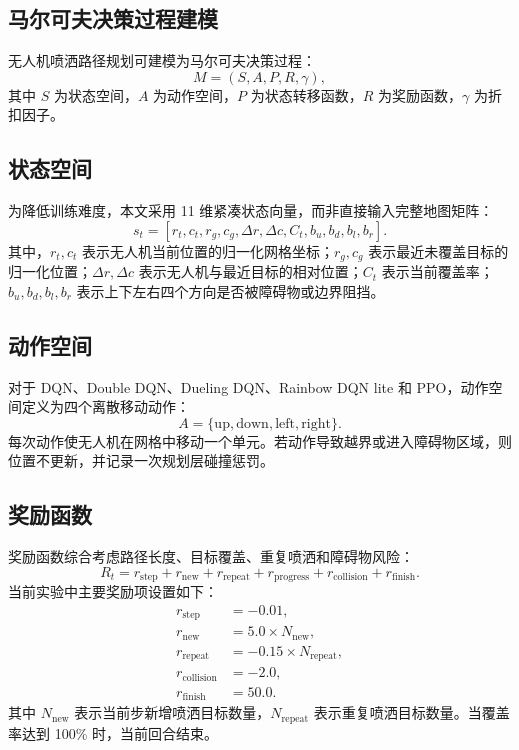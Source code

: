 \documentclass[UTF8]{ctexart}
\begin{document}
\subsection{马尔可夫决策过程建模}

无人机喷洒路径规划可建模为马尔可夫决策过程：
\begin{equation}
M = (S, A, P, R, \gamma),
\end{equation}
其中 $S$ 为状态空间，$A$ 为动作空间，$P$ 为状态转移函数，$R$ 为奖励函数，$\gamma$ 为折扣因子。

\subsection{状态空间}

为降低训练难度，本文采用 11 维紧凑状态向量，而非直接输入完整地图矩阵：
\begin{equation}
s_t = [r_t, c_t, r_g, c_g, \Delta r, \Delta c, C_t, b_u, b_d, b_l, b_r].
\end{equation}
其中，$r_t,c_t$ 表示无人机当前位置的归一化网格坐标；$r_g,c_g$ 表示最近未覆盖目标的归一化位置；$\Delta r,\Delta c$ 表示无人机与最近目标的相对位置；$C_t$ 表示当前覆盖率；$b_u,b_d,b_l,b_r$ 表示上下左右四个方向是否被障碍物或边界阻挡。

\subsection{动作空间}

对于 DQN、Double DQN、Dueling DQN、Rainbow DQN lite 和 PPO，动作空间定义为四个离散移动动作：
\begin{equation}
A = \{\mathrm{up}, \mathrm{down}, \mathrm{left}, \mathrm{right}\}.
\end{equation}
每次动作使无人机在网格中移动一个单元。若动作导致越界或进入障碍物区域，则位置不更新，并记录一次规划层碰撞惩罚。

\subsection{奖励函数}

奖励函数综合考虑路径长度、目标覆盖、重复喷洒和障碍物风险：
\begin{equation}
R_t = r_{\mathrm{step}} + r_{\mathrm{new}} + r_{\mathrm{repeat}} + r_{\mathrm{progress}} + r_{\mathrm{collision}} + r_{\mathrm{finish}}.
\end{equation}
当前实验中主要奖励项设置如下：
\begin{align}
r_{\mathrm{step}} &= -0.01, \\
r_{\mathrm{new}} &= 5.0 \times N_{\mathrm{new}}, \\
r_{\mathrm{repeat}} &= -0.15 \times N_{\mathrm{repeat}}, \\
r_{\mathrm{collision}} &= -2.0, \\
r_{\mathrm{finish}} &= 50.0.
\end{align}
其中 $N_{\mathrm{new}}$ 表示当前步新增喷洒目标数量，$N_{\mathrm{repeat}}$ 表示重复喷洒目标数量。当覆盖率达到 100\% 时，当前回合结束。
\end{document}
